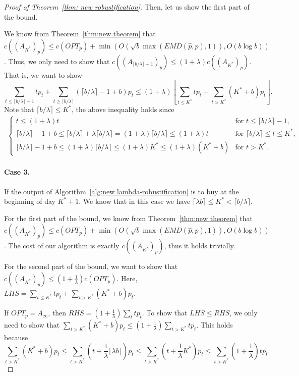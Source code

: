 \begin{proof}[Proof of Theorem~\ref{thm: new robustification}]
    Then, let us show the first part of the bound. 

    We know from Theorem~\ref{thm:new theorem} that $c((A_{K^*})_p) \leq c(OPT_p) + \min \left(O(\sqrt{b} \max(EMD(\hat{p},p),1)), O(b \log b)\right)$. Thus, we only need to show that $c((A_{\lceil b/\lambda \rceil - 1})_p) \leq (1+\lambda)c((A_{K^*})_p)$. That is, we want to show
    \[\sum _{t \leq \lceil b/\lambda  \rceil - 1} tp_t + \sum_{t \geq \lceil b/\lambda  \rceil} (\lceil b/\lambda  \rceil - 1 + b)p_t \leq (1+\lambda)\left[ \sum_{t \leq K^*}tp_t + \sum_{t>K^*}(K^*+b)p_t \right].\]
    Note that $\lceil b/\lambda  \rceil \leq K^* $, the above inequality holds since
    \begin{align*} 
    \begin{cases}
        t \leq (1+\lambda)t & \text{for } t \leq \lceil b/\lambda  \rceil - 1, \\
        \lceil b/\lambda  \rceil - 1 + b \leq  \lceil b/\lambda  \rceil + \lambda \lceil b/\lambda  \rceil= (1+\lambda)\lceil b/\lambda  \rceil  \leq (1+\lambda)t & \text{for } \lceil b/\lambda  \rceil \leq t \leq K^*, \\
        \lceil b/\lambda  \rceil - 1 + b \leq (1+\lambda)\lceil b/\lambda  \rceil \leq (1+\lambda)K^* \leq (1+\lambda)(K^*+b) & \text{for } t > K^*.
    \end{cases}
    \end{align*}

    \paragraph{Case 3.} If the output of Algorithm~\ref{alg:new lambda-robustification} is to buy at the beginning of day $K^* +1$. We know that in this case we have $\lceil \lambda b \rceil \leq K^* < \lceil b/\lambda \rceil $. 

    For the first part of the bound, we know from Theorem~\ref{thm:new theorem} that $c((A_{K^*})_p) \leq c(OPT_p) + \min \left(O(\sqrt{b} \max(EMD(\hat{p},p),1)), O(b \log b)\right)$. The cost of our algorithm is exactly $c((A_{K^*})_p)$, thus it holds trivially.

    For the second part of the bound, we want to show that $c((A_{K^*})_p) \leq (1+\frac{1}{\lambda})c(OPT_p)$. Here, $LHS=\sum _{t \leq K^*} tp_t + \sum_{t > K^*} (K^* + b)p_t$.
    
    
    If $OPT_p = A_\infty$, then $RHS=(1+\frac{1}{\lambda})\sum_t tp_t$. To show that $LHS \leq RHS$, we only need to show that $\sum_{t > K^*} (K^* + b)p_t  \leq (1+\frac{1}{\lambda})\sum_{t > K^*} tp_t$. This holds because
    \[\sum_{t > K^*} (K^* + b)p_t  \leq \sum_{t > K^*} (t + \frac{1}{\lambda} \lceil \lambda b \rceil)p_t \leq \sum_{t > K^*} (t + \frac{1}{\lambda} K^*)p_t \leq \sum_{t > K^*} (1+\frac{1}{\lambda}) tp_t.\]


\end{proof}
